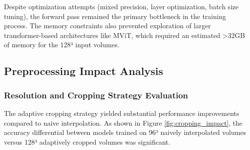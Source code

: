 \documentclass[11pt, a4paper]{article}
\begin{document}
Despite optimization attempts (mixed precision, layer optimization, batch size tuning), the forward pass remained the primary bottleneck in the training process. The memory constraints also prevented exploration of larger transformer-based architectures like MViT, which required an estimated >32GB of memory for the 128³ input volumes.

\subsection{Preprocessing Impact Analysis}

\subsubsection{Resolution and Cropping Strategy Evaluation}

The adaptive cropping strategy yielded substantial performance improvements compared to naive interpolation. As shown in Figure \ref{fig:cropping_impact}, the accuracy differential between models trained on 96³ naively interpolated volumes versus 128³ adaptively cropped volumes was significant.
\end{document}
